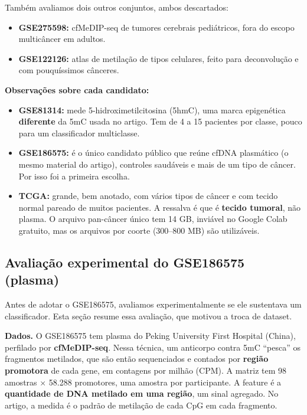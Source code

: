 \documentclass[11pt,a4paper]{article}
\providecommand{\tightlist}{\setlength{\itemsep}{0pt}\setlength{\parskip}{0pt}}
\begin{document}
Também avaliamos dois outros conjuntos, ambos descartados:

\begin{itemize}
\tightlist
\item
  \textbf{GSE275598:} cfMeDIP-seq de tumores cerebrais pediátricos, fora do
  escopo multicâncer em adultos.
\item
  \textbf{GSE122126:} atlas de metilação de tipos celulares, feito para
  deconvolução e com pouquíssimos cânceres.
\end{itemize}

\textbf{Observações sobre cada candidato:}

\begin{itemize}
\tightlist
\item
  \textbf{GSE81314:} mede 5-hidroximetilcitosina (5hmC), uma marca epigenética
  \textbf{diferente} da 5mC usada no artigo. Tem de 4 a 15 pacientes por classe,
  pouco para um classificador multiclasse.
\item
  \textbf{GSE186575:} é o único candidato público que reúne cfDNA plasmático (o
  mesmo material do artigo), controles saudáveis e mais de um tipo de câncer.
  Por isso foi a primeira escolha.
\item
  \textbf{TCGA:} grande, bem anotado, com vários tipos de câncer e com tecido
  normal pareado de muitos pacientes. A ressalva é que é \textbf{tecido
  tumoral}, não plasma. O arquivo pan-câncer único tem 14 GB, inviável no Google
  Colab gratuito, mas os arquivos por coorte (300--800 MB) são utilizáveis.
\end{itemize}

\subsection{Avaliação experimental do GSE186575 (plasma)}

Antes de adotar o GSE186575, avaliamos experimentalmente se ele sustentava um
classificador. Esta seção resume essa avaliação, que motivou a troca de dataset.

\textbf{Dados.} O GSE186575 tem plasma do Peking University First Hospital
(China), perfilado por \textbf{cfMeDIP-seq}. Nessa técnica, um anticorpo contra
5mC ``pesca'' os fragmentos metilados, que são então sequenciados e contados por
\textbf{região promotora} de cada gene, em contagens por milhão (CPM). A matriz
tem 98 amostras $\times$ 58.288 promotores, uma amostra por participante. A feature é a
\textbf{quantidade de DNA metilado em uma região}, um sinal agregado. No artigo,
a medida é o padrão de metilação de cada CpG em cada fragmento.
\end{document}
